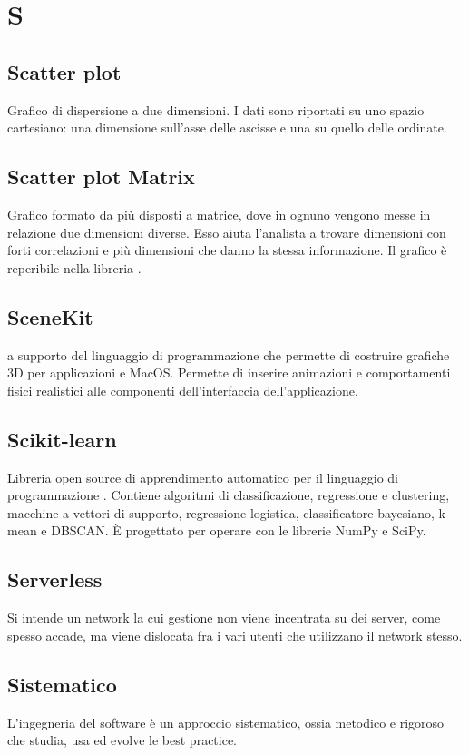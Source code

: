 \section*{S}
\markright{}
\subsection*{Scatter plot}
Grafico di dispersione a due dimensioni. I dati sono riportati su uno spazio cartesiano: una dimensione sull'asse delle ascisse e una su quello delle ordinate. 

\subsection*{Scatter plot Matrix}
Grafico formato da più  disposti a matrice, dove in ognuno vengono messe in relazione due dimensioni diverse. Esso aiuta l'analista a trovare dimensioni con forti correlazioni e più  dimensioni che danno la stessa informazione. Il grafico è reperibile nella libreria .

\subsection*{SceneKit}
 a supporto del linguaggio di programmazione  che permette di costruire grafiche 3D per applicazioni  e MacOS. Permette di inserire animazioni e comportamenti fisici realistici alle componenti dell'interfaccia dell'applicazione. 

\subsection*{Scikit-learn}
Libreria open source di apprendimento automatico per il linguaggio di programmazione . Contiene algoritmi di classificazione, regressione e clustering, macchine a vettori di supporto, regressione logistica, classificatore bayesiano, k-mean e DBSCAN. È progettato per operare con le librerie NumPy e SciPy. 

\subsection*{Serverless}
Si intende un network la cui gestione non viene incentrata su dei server, come spesso accade, ma viene dislocata fra i vari utenti che utilizzano il network stesso.

\subsection*{Sistematico}
L'ingegneria del software è un approccio sistematico, ossia metodico e rigoroso che studia, usa ed evolve le best practice.

